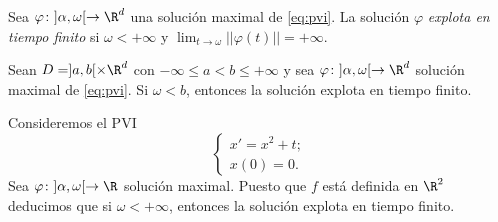 \documentclass{article}
\begin{document}
\begin{definition}
  Sea $\varphi \colon ]\alpha, \omega[ \to \R^d$ una solución maximal de \eqref{eq:pvi}. La solución
  $\varphi$ \emph{explota en tiempo finito} si $\omega < +\infty$ y
  $\lim_{t \to \omega} ||\varphi(t)|| = + \infty$.
\end{definition}

\begin{corollary} \label{cor:explotar} Sean $D = ]a,b[ \times \R^d$ con
  $-\infty \le a < b \le +\infty$ y sea $\varphi \colon ]\alpha, \omega[ \to \R^d$ solución maximal
  de \eqref{eq:pvi}. Si $\omega < b$, entonces la solución explota en tiempo finito.
\end{corollary}

\begin{ex}
  Consideremos el PVI
  \[
    \begin{cases}
      x' = x^2 + t; \\
      x(0) = 0.
    \end{cases}
  \]
  Sea $\varphi \colon ]\alpha, \omega[ \to \R$ solución maximal. Puesto que $f$ está definida en
  $\R^2$ deducimos que si $\omega < +\infty$, entonces la solución explota en tiempo finito.
\end{ex}
\end{document}
